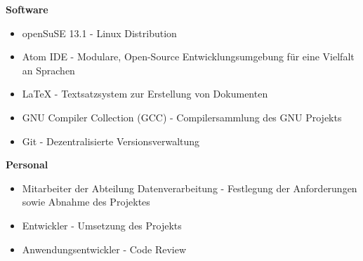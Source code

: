 \textbf{Software}
\begin{itemize}
    \item openSuSE 13.1 - Linux Distribution
    \item Atom IDE - Modulare, Open-Source Entwicklungsumgebung für eine Vielfalt an Sprachen
    \item LaTeX - Textsatzsystem zur Erstellung von Dokumenten
    \item GNU Compiler Collection (GCC) - Compilersammlung des GNU Projekts
    \item Git - Dezentralisierte Versionsverwaltung
\end{itemize}

\textbf{Personal}
\begin{itemize}
    \item Mitarbeiter der Abteilung Datenverarbeitung - Festlegung der Anforderungen sowie Abnahme des Projektes
    \item Entwickler - Umsetzung des Projekts
    \item Anwendungsentwickler - Code Review
\end{itemize}


